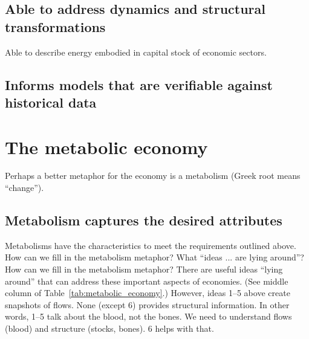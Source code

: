 \subsection{Able to address dynamics and structural transformations}
\label{sec:structure}

Able to describe energy embodied in capital stock of economic sectors.

\subsection{Informs models that are verifiable against historical data}
\label{sec:verifiable}

\section{The metabolic economy}
\label{sec:metabolic_economy}

Perhaps a better metaphor for the economy is a metabolism (Greek root means ``change''). 

\subsection{Metabolism captures the desired attributes}
\label{sec:metabolism_works}
     
Metabolisms have the characteristics to meet the requirements outlined above.
How can we fill in the metabolism metaphor? What ``ideas ... are lying around''?
How can we fill in the metabolism metaphor? 
There are useful ideas ``lying around'' that can address these important aspects of economies. 
(See middle column of Table~\ref{tab:metabolic_economy}.) 
However, ideas 1–5 above create snapshots of flows. 
None (except 6) provides structural information. 
In other words, 1–5 talk about the blood, not the bones. 
We need to understand flows (blood) and structure (stocks, bones). 
6 helps with that.

